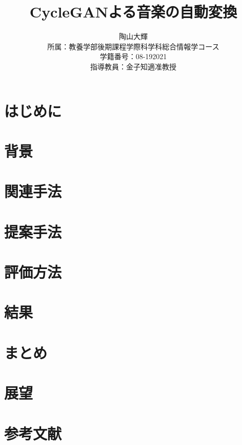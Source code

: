 \documentclass[dvipdfmx]{jreport}
\title{CycleGANよる音楽の自動変換}
\author{陶山大輝 \\
所属：教養学部後期課程学際科学科総合情報学コース\\
学籍番号：08-192021\\
指導教員：金子知適准教授\\}
\begin{document}
\maketitle

\begin{abstract}
    
\end{abstract}

\chapter{はじめに}

\chapter{背景}

\chapter{関連手法}

\cite{CycleGAN}

\chapter{提案手法}

\chapter{評価方法}

\chapter{結果}

\chapter{まとめ}


\chapter{展望}

\chapter{参考文献}



\end{document}
